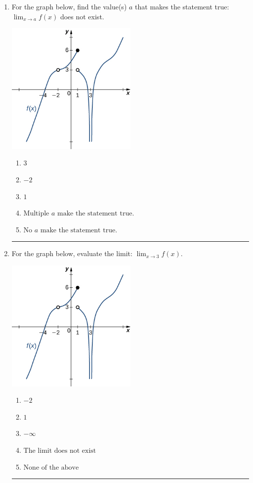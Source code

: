 \documentclass[14pt]{extbook}
\newcommand{\litem}[1]{\item#1\hspace*{-1cm}\rule{\textwidth}{0.4pt}}
\begin{document}
\begin{enumerate}
{\begin{enumerate}[label=\Alph*.]
\end{enumerate} }
\litem{
For the graph below, find the value(s) $a$ that makes the statement true: $ \displaystyle \lim_{x \rightarrow a} f(x)$ does not exist.
\begin{center}
    \includegraphics[width=0.5\textwidth]{../Figures/evaluateLimitGraphicallyCopyC.png}
\end{center}
\begin{enumerate}[label=\Alph*.]
\item \( 3 \)
\item \( -2 \)
\item \( 1 \)
\item \( \text{Multiple } a \text{ make the statement true}. \)
\item \( \text{No } a \text{ make the statement true}. \)

\end{enumerate} }
\litem{
For the graph below, evaluate the limit: $ \displaystyle \lim_{x \rightarrow 3} f(x)$.
\begin{center}
    \includegraphics[width=0.5\textwidth]{../Figures/evaluateLimitGraphicallyC.png}
\end{center}
\begin{enumerate}[label=\Alph*.]
\item \( -2 \)
\item \( 1 \)
\item \( -\infty \)
\item \( \text{The limit does not exist} \)
\item \( \text{None of the above} \)


\end{enumerate}}
\end{enumerate}
\end{document}
